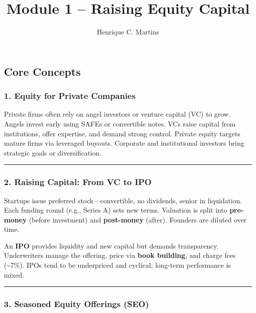 \documentclass[
  9pt,
  letterpaper,
  DIV=11,
  numbers=noendperiod]{scrartcl}
\title{Module 1 -- Raising Equity Capital}
\author{Henrique C. Martins}
\date{}
\begin{document}
\maketitle

\subsection{Core Concepts}\label{core-concepts}

\subsubsection{1. Equity for Private
Companies}\label{equity-for-private-companies}

Private firms often rely on angel investors or venture capital (VC) to
grow. Angels invest early using SAFEs or convertible notes. VCs raise
capital from institutions, offer expertise, and demand strong control.
Private equity targets mature firms via leveraged buyouts. Corporate and
institutional investors bring strategic goals or diversification.

\begin{center}\rule{0.5\linewidth}{0.5pt}\end{center}

\subsubsection{2. Raising Capital: From VC to
IPO}\label{raising-capital-from-vc-to-ipo}

Startups issue preferred stock---convertible, no dividends, senior in
liquidation. Each funding round (e.g., Series A) sets new terms.
Valuation is split into \textbf{pre-money} (before investment) and
\textbf{post-money} (after). Founders are diluted over time.

An \textbf{IPO} provides liquidity and new capital but demands
transparency. Underwriters manage the offering, price via \textbf{book
building}, and charge fees (\textasciitilde7\%). IPOs tend to be
underpriced and cyclical; long-term performance is mixed.

\begin{center}\rule{0.5\linewidth}{0.5pt}\end{center}

\subsubsection{3. Seasoned Equity Offerings
(SEO)}\label{seasoned-equity-offerings-seo}
\end{document}
